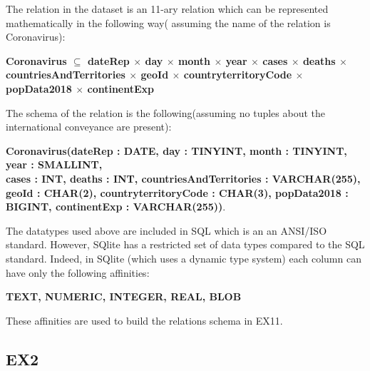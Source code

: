 \documentclass{article}
\begin{document}
 The relation in the dataset is an 11-ary relation which can be represented mathematically in the following way( assuming the name of the relation is Coronavirus):
\begin{center}
    

\textbf{Coronavirus $\subseteq$ dateRep $\times$ day $\times$ month $\times$ year $\times$ cases $\times$ deaths $\times$ countriesAndTerritories $\times$ geoId $\times$ countryterritoryCode $\times$ popData2018 $\times$ continentExp}
\end{center}
The schema of the relation is the following(assuming no tuples about the international conveyance are present):
\begin{center}
    
    \textbf{Coronavirus(dateRep : DATE, day : TINYINT, month : TINYINT, year : SMALLINT,\\ cases : INT, deaths : INT, countriesAndTerritories : VARCHAR(255), geoId : CHAR(2), countryterritoryCode : CHAR(3),  popData2018 : BIGINT, continentExp : VARCHAR(255))}.\\
    
\end{center}




The datatypes used above are included in SQL which is an an ANSI/ISO standard.
However, SQlite has a restricted set of data types compared to the SQL standard. Indeed, in SQlite (which uses a dynamic type system) each column can have only the following affinities:
\begin{center}
    \textbf{TEXT, NUMERIC, INTEGER, REAL, BLOB}
\end{center}
These affinities are used to build the relations schema in EX11.

\subsection{EX2}
    
\end{document}
